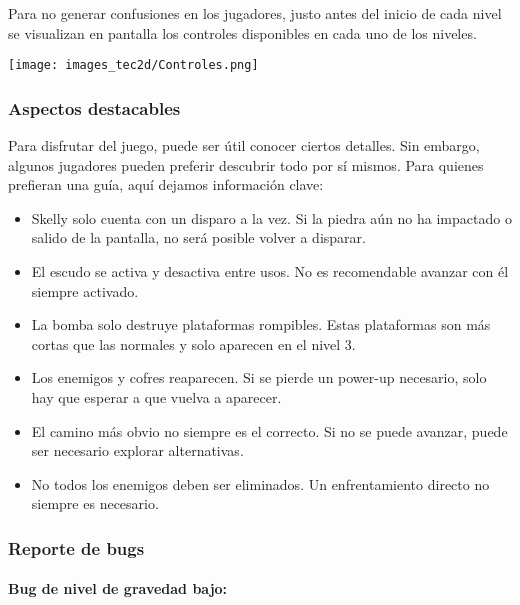 \documentclass[12pt,a4paper,twoside,spanish]{article}      %
\begin{document}
Para no generar confusiones en los jugadores, justo antes del inicio de cada nivel se visualizan en pantalla los controles disponibles en cada uno de los niveles.

\begin{center}
    \texttt{[image: images\_tec2d/Controles.png]}
\end{center}


\subsubsection{Aspectos destacables}

Para disfrutar del juego, puede ser útil conocer ciertos detalles. Sin embargo, algunos jugadores pueden preferir descubrir todo por sí mismos. Para quienes prefieran una guía, aquí dejamos información clave:

\begin{itemize}
    \item Skelly solo cuenta con un disparo a la vez. Si la piedra aún no ha impactado o salido de la pantalla, no será posible volver a disparar.
    \item El escudo se activa y desactiva entre usos. No es recomendable avanzar con él siempre activado.
    \item La bomba solo destruye plataformas rompibles. Estas plataformas son más cortas que las normales y solo aparecen en el nivel 3.
    \item Los enemigos y cofres reaparecen. Si se pierde un power-up necesario, solo hay que esperar a que vuelva a aparecer.
    \item El camino más obvio no siempre es el correcto. Si no se puede avanzar, puede ser necesario explorar alternativas.
    \item No todos los enemigos deben ser eliminados. Un enfrentamiento directo no siempre es necesario.
\end{itemize}





\subsubsection{Reporte de bugs}

\paragraph*{Bug de nivel de gravedad bajo:}
\end{document}

